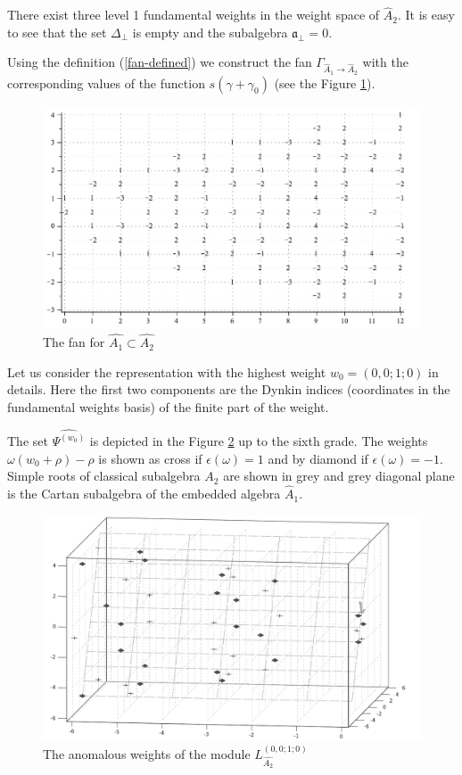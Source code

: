 \documentclass[a4paper,12pt]{article}
\theoremstyle{definition} \newtheorem{Def}{Definition}
\begin{document}
There exist three level 1 fundamental weights in the weight space of $\hat{A}_2$.
It is easy to see that the set $\Delta_{\bot}$ is empty and the subalgebra $\mathfrak{a}_{\bot}=0$.

Using the definition (\ref{fan-defined})  we construct the fan $\Gamma_{\hat A_1\to\hat A_2}$  with the corresponding values of the function $s(\gamma+\gamma_0)$ (see the Figure \ref{fig:AffineA2A1Fan}). 

\begin{figure}[h!bt]
  \centering
  \includegraphics[width=135mm]{AffineA2_A1_fan.pdf}
  \caption{The fan for $\hat{A_1}\subset \hat{A_2}$}
  \label{fig:AffineA2A1Fan}
\end{figure}

Let us consider the representation with the highest weight $w_0=(0,0;1;0)$ in details. Here the first two components are the Dynkin indices (coordinates in the fundamental weights basis) of the finite part of the weight.

The set $\widehat{\Psi^{(w_0)}}$  is depicted in the Figure \ref{fig:affine_A2_anom_point} up to the sixth grade. The weights $\omega (w_0+\rho)-\rho$ is shown as cross if $\epsilon(\omega)=1$ and by diamond if $\epsilon(\omega)=-1$. Simple roots of classical subalgebra $A_2$ are shown in grey and grey diagonal plane is the Cartan subalgebra of the embedded algebra $\hat{A}_1$.

\begin{figure}[h!tb]
  \includegraphics[width=140mm]{AffineA2_A1_anom.pdf}
  \caption{The anomalous weights of the module $L^{(0,0;1;0)}_{\hat{A_2}}$}
  \label{fig:affine_A2_anom_point}
\end{figure}
\end{document}
